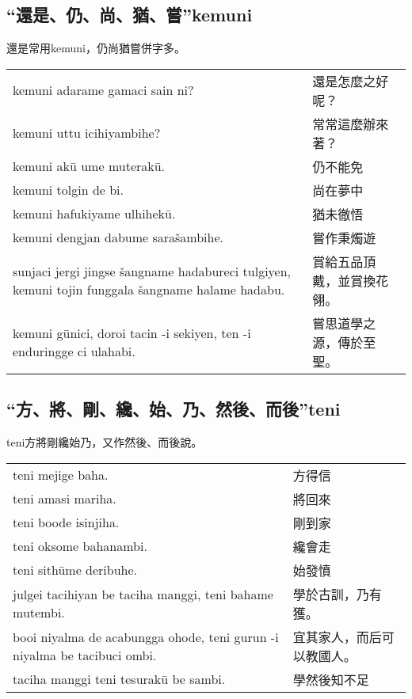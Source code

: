 \documentclass{article}
\begin{document}
\subsection{“還是、仍、尚、猶、嘗”kemuni}
\noindent 還是常用kemuni，仍尚猶嘗併字多。
\begin{center}
    \begin{tabularx}{\textwidth}{XX}
        kemuni adarame gamaci sain ni? & 還是怎麼之好呢？\\
        kemuni uttu icihiyambihe? & 常常這麼辦來著？\\
        kemuni ak\={u} ume muterak\={u}. & 仍不能免\\
        kemuni tolgin de bi. & 尚在夢中\\
        kemuni hafukiyame ulhihek\={u}. & 猶未徹悟\\
        kemuni dengjan dabume sara\v{s}ambihe. & 嘗作秉燭遊\\
        sunjaci jergi jingse \v{s}angname hadabureci tulgiyen, kemuni tojin funggala \v{s}angname halame hadabu. & 賞給五品頂戴，並賞換花翎。\\
        kemuni g\={u}nici, doroi tacin -i sekiyen, ten -i enduringge ci ulahabi. & 嘗思道學之源，傳於至聖。
    \end{tabularx}
\end{center}

\subsection{“方、將、剛、纔、始、乃、然後、而後”teni}
\noindent teni方將剛纔始乃，又作然後、而後說。
\begin{center}
    \begin{tabularx}{\textwidth}{XX}
        teni mejige baha. & 方得信\\
        teni amasi mariha. & 將回來\\
        teni boode isinjiha. & 剛到家\\
        teni oksome bahanambi. & 纔會走\\
        teni sith\={u}me deribuhe. & 始發憤\\
        julgei tacihiyan be taciha manggi, teni bahame mutembi. & 學於古訓，乃有獲。\\
        booi niyalma de acabungga ohode, teni gurun -i niyalma be tacibuci ombi. & 宜其家人，而后可以教國人。\\
        taciha manggi teni tesurak\={u} be sambi. & 學然後知不足
    \end{tabularx}
\end{center}
\end{document}
